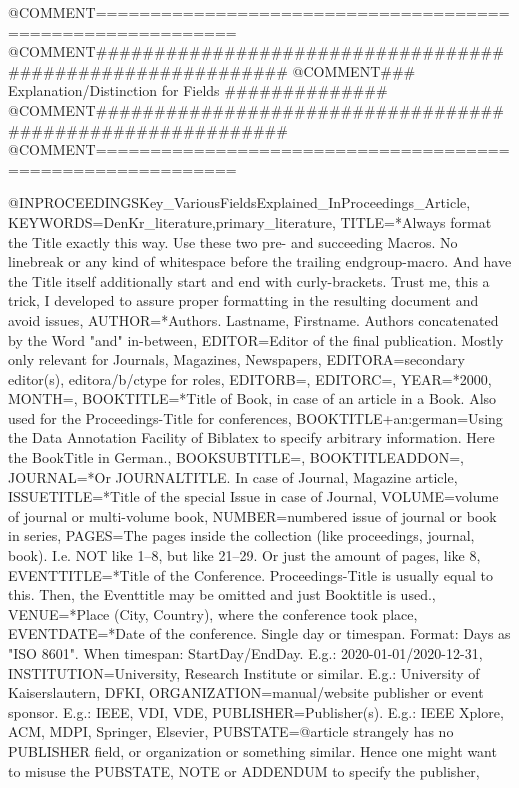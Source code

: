 @COMMENT{===========================================================}
@COMMENT{###########################################################}
@COMMENT{###    Explanation/Distinction for Fields    ##############}
@COMMENT{###########################################################}
@COMMENT{===========================================================}


@INPROCEEDINGS{Key_VariousFieldsExplained_InProceedings_Article,
    KEYWORDS={DenKr_literature,primary_literature},
    TITLE={\begingroup
        {*Always format the Title exactly this way. Use these two pre- and succeeding Macros. No linebreak or any kind of whitespace before the trailing endgroup-macro. And have the Title itself additionally start and end with curly-brackets.
        Trust me, this a trick, I developed to assure proper formatting in the resulting document and avoid issues}\endgroup},
    AUTHOR={*Authors. Lastname, Firstname. Authors concatenated by the Word "and" in-between},
    EDITOR={Editor of the final publication. Mostly only relevant for Journals, Magazines, Newspapers},
    EDITORA={secondary editor(s), editora/b/ctype for roles},
    EDITORB={},
    EDITORC={},
    YEAR={*2000},
    MONTH={},
    BOOKTITLE={*Title of Book, in case of an article in a Book. Also used for the Proceedings-Title for conferences},
    BOOKTITLE+an:german={Using the Data Annotation Facility of Biblatex to specify arbitrary information. Here the BookTitle in German.},
    BOOKSUBTITLE={},
    BOOKTITLEADDON={},
    JOURNAL={*Or JOURNALTITLE. In case of Journal, Magazine article},
    ISSUETITLE={*Title of the special Issue in case of Journal},
    VOLUME={volume of journal or multi-volume book},
    NUMBER={numbered issue of journal or book in series},
    PAGES={The pages inside the collection (like proceedings, journal, book). I.e. NOT like 1--8, but like 21--29. Or just the amount of pages, like 8},
    EVENTTITLE={*Title of the Conference. Proceedings-Title is usually equal to this. Then, the Eventtitle may be omitted and just Booktitle is used.},
    VENUE={*Place (City, Country), where the conference took place},
    EVENTDATE={*Date of the conference. Single day or timespan. Format: Days as "ISO 8601". When timespan: StartDay/EndDay. E.g.: 2020-01-01/2020-12-31},
    INSTITUTION={University, Research Institute or similar. E.g.: University of Kaiserslautern, DFKI},
    ORGANIZATION={manual/website publisher or event sponsor. E.g.: IEEE, VDI, VDE},
    PUBLISHER={Publisher(s). E.g.: IEEE Xplore, ACM, MDPI, Springer, Elsevier},
    PUBSTATE={@article strangely has no PUBLISHER field, or organization or something similar. Hence one might want to misuse the PUBSTATE, NOTE or ADDENDUM to specify the publisher},
}
